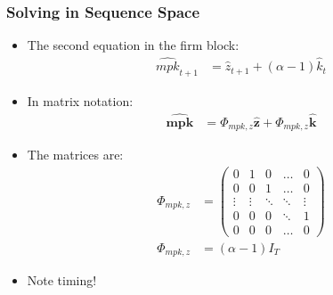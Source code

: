 \documentclass[english,xcolor=svgnames]{beamer}
\begin{document}
	\begin{frame}
		\frametitle{Solving in Sequence Space}
			\begin{itemize}
				\item The second equation in the firm block:
				\begin{align*}
					\hat{mpk}_{t+1} &=  \hat{z}_{t+1} + (\alpha-1) \hat{k}_t 
				\end{align*}
				\item In matrix notation:
				\begin{align*}
					\mathbf{\hat{mpk}} &= \Phi_{mpk,z}\mathbf{\hat{z}} + \Phi_{mpk,z}\mathbf{\hat{k}}
				\end{align*}
				\item The matrices are:
				\begin{align*}
					\Phi_{mpk,z}&=\begin{pmatrix}
						0 & 1 & 0 & \hdots & 0  \\
						0 & 0 & 1 & \hdots & 0  \\
						\vdots & \vdots & \ddots & \ddots & \vdots  \\
						0 & 0 & 0 & \ddots & 1  \\
						0 & 0 & 0 & \hdots & 0 
					\end{pmatrix} \\
					\Phi_{mpk,z}&=(\alpha-1)  I_T 
				\end{align*}
				\item Note timing!
			\end{itemize}
	\end{frame}
\end{document}
